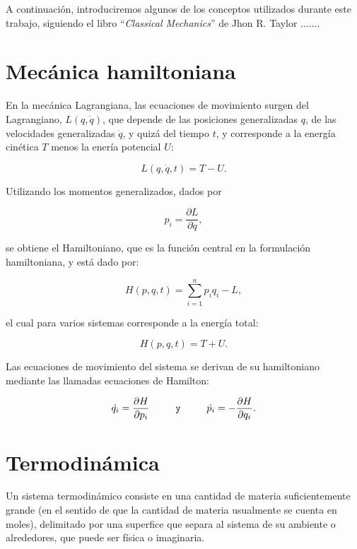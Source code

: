\documentclass[letterpaper,12pt,oneside]{book}
\begin{document}
	A continuaci\'on, introduciremos algunos de los conceptos utilizados durante este trabajo, siguiendo el libro ``\emph{Classical Mechanics}'' de Jhon R. Taylor .......
	
	\section{Mec\'anica hamiltoniana}
	
	En la mec\'anica Lagrangiana, las ecuaciones de movimiento surgen del Lagrangiano, $L(q, \dot{q})$, que depende de las posiciones generalizadas $q$, de las velocidades generalizadas $\dot{q}$, y quiz\'a del tiempo $t$, y corresponde a la energ\'ia cin\'etica $T$ menos la ener\'ia potencial $U$:
	
	\begin{equation}
	L(q, \dot{q}, t) = T - U.
	\end{equation}
	
	Utilizando los momentos generalizados, dados por
	
	\begin{equation}
		p_i = \frac{\partial L}{\partial \dot{q}},
	\end{equation}
	
	\noindent se obtiene el Hamiltoniano, que es la funci\'on central en la formulaci\'on hamiltoniana, y est\'a dado por:
	
	\begin{equation}
		H(p, q, t) = \sum_{i=1}^n p_iq_i - L,
	\end{equation}
	
	\noindent el cual para varios sistemas corresponde a la energ\'ia total:
	
	\begin{equation}
		H(p, q, t) = T + U.
	\end{equation}
		
	Las ecuaciones de movimiento del sistema se derivan de su hamiltoniano mediante las llamadas ecuaciones de Hamilton:
	
	\begin{equation}\label{eq:HamiltonEquation}
		\dot{q_i} = \frac{\partial H}{\partial p_i} \verb|     y     | \dot{p_i} = -\frac{\partial H}{\partial q_i}.
	\end{equation}
		
	\section{Termodin\'amica}
	
	Un sistema termodin\'amico consiste en una cantidad de materia suficientemente grande (en el sentido de que la cantidad de materia usualmente se cuenta en moles), delimitado por una superfice que separa al sistema de su ambiente o alrededores, que puede ser f\'isica o imaginaria.
	
\end{document}
